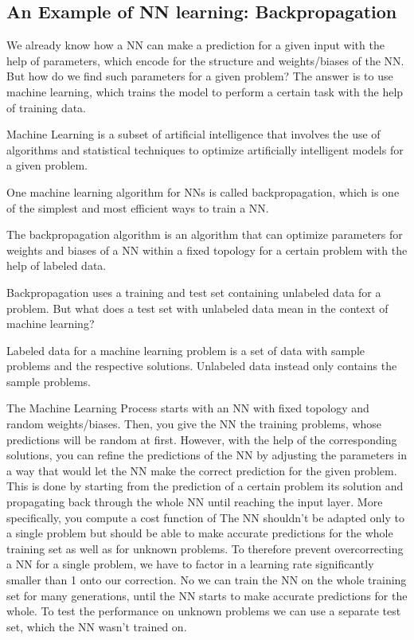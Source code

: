 \documentclass[11pt]{report}
\newcommand{\mydeflabel}{}
\newenvironment{mydef}[1]
 {\renewcommand\mydeflabel{#1}\begin{mydefinner}}
 {\end{mydefinner}}
\begin{document}
            \subsection{An Example of NN learning: Backpropagation}\label{subsec:an-example-of-nn-learning:-backpropagation}
    We already know how a NN can make a prediction for a given input with the help of parameters, which encode for the structure and weights/biases of the NN.\@
    But how do we find such parameters for a given problem?
    The answer is to use machine learning, which trains the model to perform a certain task with the help of training data.
    \begin{mydef}{Machine Learning}
        Machine Learning is a subset of artificial intelligence that involves the use of algorithms and statistical techniques to optimize artificially intelligent models for a given problem.
    \end{mydef}
    One machine learning algorithm for NNs is called backpropagation, which is one of the simplest and most efficient ways to train a NN.\@
    \begin{mydef}{Backpropagation}
        The backpropagation algorithm is an algorithm that can optimize parameters for weights and biases of a NN within a fixed topology for a certain problem with the help of labeled data.
    \end{mydef}
    Backpropagation uses a training and test set containing unlabeled data for a problem.
    But what does a test set with unlabeled data mean in the context of machine learning?
    \begin{mydef}{(Un)labeled Data}
        Labeled data for a machine learning problem is a set of data with sample problems and the respective solutions.
        Unlabeled data instead only contains the sample problems.
    \end{mydef}
    The Machine Learning Process starts with an NN with fixed topology and random weights/biases.
    Then, you give the NN the training problems, whose predictions will be random at first.
    However, with the help of the corresponding solutions, you can refine the predictions of the NN by adjusting the parameters in a way that would let the NN make the correct prediction for the given problem.
    This is done by starting from the prediction of a certain problem its solution and propagating back through the whole NN until reaching the input layer.
    More specifically, you compute a cost function of
    The NN shouldn't be adapted only to a single problem but should be able to make accurate predictions for the whole training set as well as for unknown problems.
    To therefore prevent overcorrecting a NN for a single problem, we have to factor in a learning rate significantly smaller than 1 onto our correction.
    No we can train the NN on the whole training set for many generations, until the NN starts to make accurate predictions for the whole.
    To test the performance on unknown problems we can use a separate test set, which the NN wasn't trained on.
\end{document}
